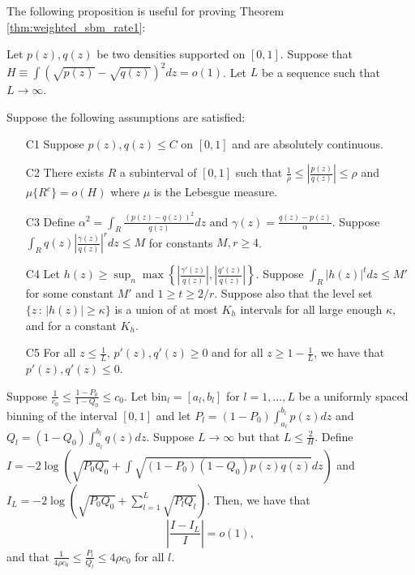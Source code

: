 \documentclass{article}
\newcommand{\bin}{\text{bin}}
\begin{document}
\noindent The following proposition is useful for proving Theorem \ref{thm:weighted_sbm_rate1}:
\begin{proposition} 
\label{prop:discretization1}
Let $p(z), q(z)$ be two densities supported on $[0,1]$. Suppose that $H \equiv \int (\sqrt{p(z)} - \sqrt{q(z)})^2 dz = o(1)$. Let $L$ be a sequence such that $L \rightarrow \infty$.


Suppose the following assumptions are satisfied:
\begin{enumerate}
\item[C1] Suppose $p(z), q(z) \leq C$ on $[0,1]$ and are absolutely continuous.
\item[C2] There exists $R$ a subinterval of $[0,1]$ such that $\frac{1}{\rho} \leq \left| \frac{p(z)}{q(z)} \right| \leq \rho$ and $\mu\{R^c\} = o(H)$ where $\mu$ is the Lebesgue measure.

\item[C3] Define $\alpha^2 = \int_R \frac{(p(z) - q(z))^2}{q(z)} dz$ and $\gamma(z) = \frac{q(z) - p(z)}{\alpha}$. Suppose $\int_R q(z) \left| \frac{\gamma(z)}{q(z)} \right|^r dz  \leq M$ for constants $M, r \geq 4$.
\item[C4] Let $h(z) \geq \sup_n \max \left\{  \left|\frac{\gamma'(z)}{q(z)} \right|, 
 \left|\frac{q'(z)}{q(z)}\right|  \right\} $. Suppose $\int_R |h(z)|^t dz \leq M'$ for some constant $M'$ and $1 \geq t \geq 2/r$. Suppose also that the level set $\{z \,:\, |h(z)| \geq \kappa\}$ is a union of at most $K_h$ intervals for all large enough $\kappa$, and for a constant $K_h$.
\item[C5] For all $z \leq \frac{1}{L}$, $p'(z), q'(z) \geq 0$ and for all $z \geq 1 - \frac{1}{L}$, we have that $p'(z), q'(z) \leq 0$.
\end{enumerate}

Suppose $\frac{1}{c_0} \leq \frac{1 - P_0}{1-Q_0} \leq c_0$. Let $\bin_l = [a_l, b_l]$ for $l=1,...,L$ be a uniformly spaced binning of the interval $[0,1]$ and let $P_l = (1- P_0) \int_{a_l}^{b_l} p(z) dz$ and $Q_l = (1-Q_0)\int_{a_l}^{b_l} q(z) dz$. Suppose $L \rightarrow \infty$ but that $L \leq \frac{2}{H}$. Define $I = -2 \log \left( \sqrt{P_0 Q_0} + \int \sqrt{(1-P_0)(1-Q_0) p(z) q(z)} dz \right)$ and $I_L = -2 \log \left( \sqrt{P_0 Q_0} + \sum_{l=1}^L \sqrt{P_l Q_l} \right)$. Then, we have that
 $$\left| \frac{I - I_L}{I} \right| = o(1),$$ 
and that $\frac{1}{4\rho c_0} \leq \frac{P_l}{Q_l} \leq 4\rho c_0$ for all $l$. 
\end{proposition}

\medskip
\end{document}
